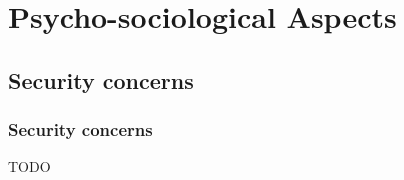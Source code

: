 \section{Psycho-sociological Aspects}

\subsection{Security concerns}

\begin{frame}
\frametitle{Security concerns}

TODO

\end{frame}

